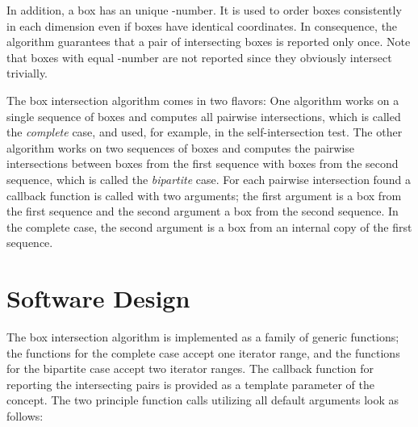 In addition, a box has an unique -number. It is used to order
boxes consistently in each dimension even if boxes have identical
coordinates. In consequence, the algorithm guarantees that a pair of
intersecting boxes is reported only once. Note that boxes with equal
-number are not reported since they obviously intersect trivially.

The box intersection algorithm comes in two flavors: One algorithm
works on a single sequence of boxes and computes all pairwise
intersections, which is called the \emph{complete\/} case, and used,
for example, in the self-intersection test. The other algorithm works
on two sequences of boxes and computes the pairwise intersections
between boxes from the first sequence with boxes from the second
sequence, which is called the \emph{bipartite\/} case. For each
pairwise intersection found a callback function is called with two
arguments; the first argument is a box from the first sequence and the
second argument a box from the second sequence. In the complete case,
the second argument is a box from an internal copy of the first
sequence.


\section{Software Design}

The box intersection algorithm is implemented as a family of generic
functions; the functions for the complete case accept one iterator
range, and the functions for the bipartite case accept two iterator
ranges. The callback function for reporting the intersecting pairs is
provided as a template parameter of the  concept.
The two principle function calls utilizing all default arguments look
as follows:





